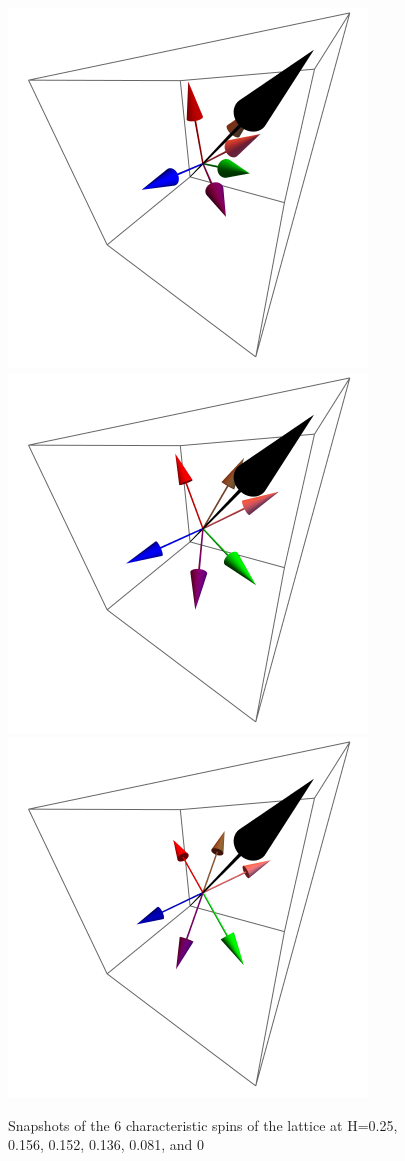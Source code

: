 \documentclass{article}
\begin{document}
\begin{figure}[ht]
\includegraphics[scale=0.4]{HVariedData/Pictures/111Dec115.png}
\includegraphics[scale=0.4]{HVariedData/Pictures/111Dec170.png}
\includegraphics[scale=0.4]{HVariedData/Pictures/111Dec251.png}
\caption{Snapshots of the 6 characteristic spins of the lattice at H=0.25, 0.156, 0.152, 0.136, 0.081, and 0}
\end{figure}
\clearpage
\end{document}
